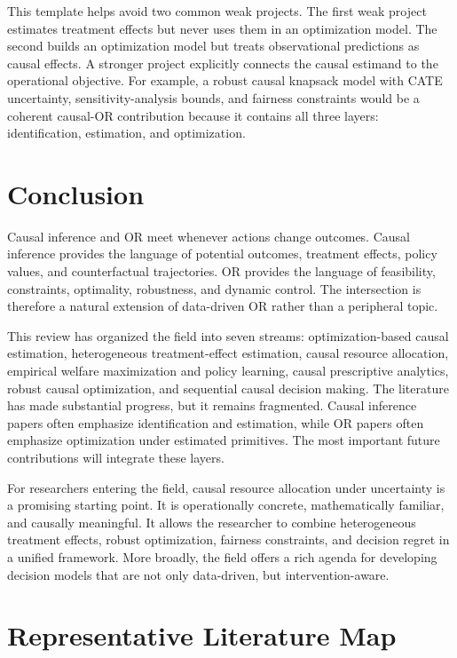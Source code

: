 \documentclass[11pt]{article}
\begin{document}
This template helps avoid two common weak projects. The first weak project estimates treatment effects but never uses them in an optimization model. The second builds an optimization model but treats observational predictions as causal effects. A stronger project explicitly connects the causal estimand to the operational objective. For example, a robust causal knapsack model with CATE uncertainty, sensitivity-analysis bounds, and fairness constraints would be a coherent causal-OR contribution because it contains all three layers: identification, estimation, and optimization.

\section{Conclusion}
\label{sec:conclusion}

Causal inference and OR meet whenever actions change outcomes. Causal inference provides the language of potential outcomes, treatment effects, policy values, and counterfactual trajectories. OR provides the language of feasibility, constraints, optimality, robustness, and dynamic control. The intersection is therefore a natural extension of data-driven OR rather than a peripheral topic.

This review has organized the field into seven streams: optimization-based causal estimation, heterogeneous treatment-effect estimation, causal resource allocation, empirical welfare maximization and policy learning, causal prescriptive analytics, robust causal optimization, and sequential causal decision making. The literature has made substantial progress, but it remains fragmented. Causal inference papers often emphasize identification and estimation, while OR papers often emphasize optimization under estimated primitives. The most important future contributions will integrate these layers.

For researchers entering the field, causal resource allocation under uncertainty is a promising starting point. It is operationally concrete, mathematically familiar, and causally meaningful. It allows the researcher to combine heterogeneous treatment effects, robust optimization, fairness constraints, and decision regret in a unified framework. More broadly, the field offers a rich agenda for developing decision models that are not only data-driven, but intervention-aware.

\appendix

\section{Representative Literature Map}
\end{document}
